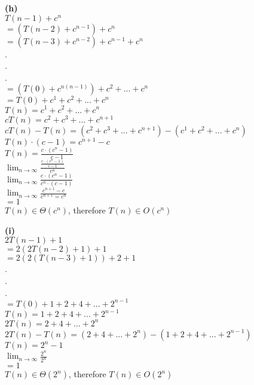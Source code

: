 \documentclass[a4paper, 11pt]{article}
\renewcommand{\part}[1] {\vspace{.10in} {\bf (#1)}}
\begin{document}
\part{h}\\
$T(n-1)+c^{n}$\\
$=(T(n-2)+c^{n-1})+c^{n}$\\
$=(T(n-3)+c^{n-2})+c^{n-1}+c^{n}$\\
.\\
.\\
.\\
$=(T(0)+c^{n(n-1)})+c^{2}+...+c^{n}$\\
$=T(0)+c^{1}+c^{2}+...+c^{n}$\\
$T(n)=c^{1}+c^{2}+...+c^{n}$\\
$cT(n)=c^{2}+c^{3}+...+c^{n+1}$\\
$cT(n)-T(n)=(c^{2}+c^{3}+...+c^{n+1})-(c^{1}+c^{2}+...+c^{n})$\\
$T(n)\cdot (c-1)=c^{n+1}-c$\\
$T(n)=\frac{c \cdot (c^{n}-1)}{c-1}$\\
$\lim_{n\to\infty} \frac{\frac{c \cdot (c^{n}-1)}{c-1}}{c^{n}}$\\
$\lim_{n\to\infty} \frac{c\cdot (c^{n}-1)}{c^{n}\cdot (c-1)}$\\
$\lim_{n\to\infty} \frac{c^{n+1}-c}{c^{n+1}=c^{n}}$\\
$=1$\\
$T(n)\in\Theta(c^{n})$, therefore $T(n)\in O(c^{n})$

\part{i}\\
$2T(n-1)+1$\\
$=2(2T(n-2)+1)+1$\\
$=2(2(T(n-3)+1))+2+1$\\
.\\
.\\
.\\
$=T(0)+1+2+4+...+2^{n-1}$\\
$T(n)=1+2+4+...+2^{n-1}$\\
$2T(n)=2+4+...+2^{n}$\\
$2T(n)-T(n)=(2+4+...+2^{n})-(1+2+4+...+2^{n-1})$\\
$T(n)=2^{n}-1$\\
$\lim_{n\to\infty} \frac{2^{n}}{2^{n}}$\\
$=1$\\
$T(n)\in\Theta(2^{n})$, therefore $T(n)\in O(2^{n})$\\
\end{document}
